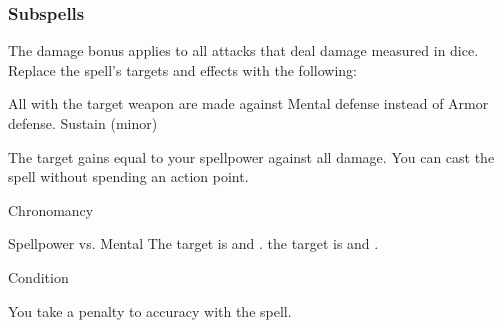 \subsubsection{Subspells}
The damage bonus applies to all attacks that deal damage measured in dice.
Replace the spell's targets and effects with the following:
\begin{spellcontent}
\begin{augmenttargetinginfo}
\end{augmenttargetinginfo}
\begin{augmenteffects}
\spelleffect
All  with the target weapon are made against Mental defense instead of Armor defense.
\spelldur Sustain (minor)
\end{augmenteffects}
\end{spellcontent}
The target gains  equal to your spellpower against all damage.
You can cast the spell without spending an action point.
\begin{spellsection}{Chronomancy}
\begin{spellheader}
\end{spellheader}
\begin{spellcontent}
\begin{spelltargetinginfo}
\end{spelltargetinginfo}
\begin{spelleffects}
\begin{spellattack}{Spellpower vs. Mental}
\spellsuccess
The target is  and .
\spellcritical
the target is  and .
\end{spellattack}
\spelldur Condition
\end{spelleffects}
\end{spellcontent}
\begin{spellfooter}
\end{spellfooter}
\begin{spellsubcontent}
\begin{spellcantrip}
You take a  penalty to accuracy with the spell.
\end{spellcantrip}
\end{spellsubcontent}
\end{spellsection}
